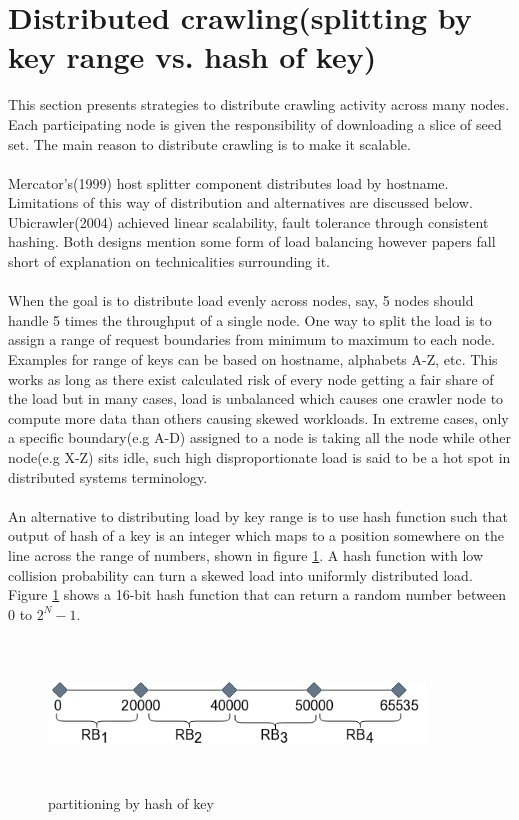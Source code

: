 \section{Distributed crawling(splitting by key range vs. hash of key)}
This section presents strategies to distribute crawling activity across many nodes. Each participating
node is given the responsibility of downloading a slice of seed set. The main reason to distribute
crawling is to make it scalable.  
\\
\\
Mercator's\cite{mercator}(1999) host splitter component distributes load by hostname. Limitations of this way of distribution and alternatives are discussed below. Ubicrawler\cite{ubicrawler}(2004) achieved linear scalability, fault tolerance through consistent hashing\cite{consisthash}. Both designs mention some form of
load balancing however papers fall short of explanation on technicalities surrounding it.
\\
\\
When the goal is to distribute load evenly across nodes, say, 5 nodes should handle 5 times the throughput
of a single node. One way to split the load is to assign a range of request boundaries from minimum to
maximum to each node. Examples for range of keys can be based on hostname, alphabets A-Z, etc. This works
as long as there exist calculated risk of every node getting a fair share of the load but in many cases,
load is unbalanced which causes one crawler node to compute more data than others causing skewed
workloads\cite{consisthash}. In extreme cases, only a specific boundary(e.g A-D) assigned to a node is taking all the node while other node(e.g X-Z) sits idle, such high disproportionate load is said to be a hot spot\cite{consisthash} in distributed systems terminology.
\\
\\
An alternative to distributing load by key range is to use hash function such that output of hash of a key
is an integer which maps to a position somewhere on the line across the range of numbers, shown in figure \ref{fig:requestboundary}. A hash function with low collision probability can turn a skewed load into uniformly distributed load. Figure \ref{fig:requestboundary} shows a 16-bit hash function that can return a
random number between $0$ to $2^N-1$.
\begin{figure}[h!]
  \centering
  \includegraphics[width=10cm,height=4cm,keepaspectratio]{../media/crawler/requestboundaries.png}
  \caption{partitioning by hash of key}
  \label{fig:requestboundary}
\end{figure}

